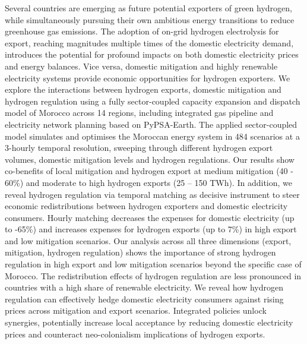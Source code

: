 Several countries are emerging as future potential exporters of green hydrogen, while simultaneously pursuing their own ambitious energy transitions to reduce greenhouse gas emissions.
The adoption of on-grid hydrogen electrolysis for export, reaching magnitudes multiple times of the domestic electricity demand, introduces the potential for profound impacts on both domestic electricity prices and energy balances.
Vice versa, domestic mitigation and highly renewable electricity systems provide economic opportunities for hydrogen exporters.
We explore the interactions between hydrogen exports, domestic mitigation and hydrogen regulation using a fully sector-coupled capacity expansion and dispatch model of Morocco across 14 regions, including integrated gas pipeline and electricity network planning based on PyPSA-Earth. The applied sector-coupled model simulates and optimises the Moroccan energy system in 484 scenarios at a 3-hourly temporal resolution, sweeping through different hydrogen export volumes, domestic  mitigation levels and hydrogen regulations.
Our results show co-beneﬁts of local mitigation and hydrogen export at medium mitigation (40 - 60\%) and moderate to high hydrogen exports (25 --
150 TWh).
In addition, we reveal hydrogen regulation via temporal matching as decisive instrument to steer economic redistributions between hydrogen exporters and domestic electricity consumers. 
Hourly matching decreases the expenses for domestic electricity (up to -65\%) and increases expenses for hydrogen exports (up to 7\%) in high export and low mitigation scenarios.
Our analysis across all three dimensions (export, mitigation, hydrogen regulation) shows the importance of strong hydrogen regulation in high export and low mitigation scenarios beyond the specific case of Morocco. 
The redistribution effects of hydrogen regulation are less pronounced in countries with a high share of renewable electricity.
We reveal how hydrogen regulation can effectively hedge domestic electricity consumers against rising prices across mitigation and export scenarios.  Integrated policies unlock synergies, potentially increase local acceptance by reducing domestic electricity prices and counteract neo-colonialism implications of hydrogen exports.




